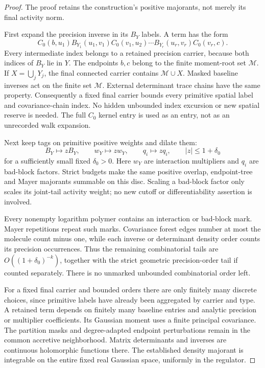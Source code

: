 \documentclass[11pt]{article}
\theoremstyle{remark}
\begin{document}
\begin{proof}
The proof retains the construction's positive majorants, not
merely its final activity norm.

First expand the precision inverse in its \(B_Y\) labels.
A term has the form
\[
 C_0(b,u_1)B_{Y_1}(u_1,v_1)C_0(v_1,u_2)
       \cdots B_{Y_r}(u_r,v_r)C_0(v_r,c).
\]
Every intermediate index belongs to a retained precision
carrier, because both indices of \(B_Y\) lie in \(Y\).
The endpoints \(b,c\) belong to the finite moment-root set
\(\mathcal M\). If \(X=\bigcup_jY_j\), the final connected
carrier contains \(\mathcal M\cup X\). Masked baseline
inverses act on the finite set \(\mathcal M\). External
determinant trace chains have the same property. Consequently
a fixed final carrier bounds every primitive spatial label
and covariance-chain index. No hidden unbounded index excursion
or new spatial reserve is needed. The full \(C_0\) kernel entry
is used as an entry, not as an unrecorded walk expansion.

Next keep tags on primitive positive weights and dilate them:
\begin{equation}
 B_Y\mapsto zB_Y,\qquad
 w_Y\mapsto zw_Y,\qquad q_i\mapsto zq_i,
 \qquad |z|\le1+\delta_0
 \label{qll-mark-dilation}
\end{equation}
for a sufficiently small fixed \(\delta_0>0\).
Here \(w_Y\) are interaction multipliers and \(q_i\) are
bad-block factors. Strict budgets make the same positive
overlap, endpoint-tree and Mayer majorants summable on this
disc. Scaling a bad-block factor only scales its joint-tail
activity weight; no new cutoff or differentiability assertion
is involved.

Every nonempty logarithm polymer contains an interaction or
bad-block mark. Mayer repetitions repeat such marks. Covariance
forest edges number at most the molecule count minus one,
while each inverse or determinant density order counts its
precision occurrences. Thus the remaining combinatorial tails
are \(O((1+\delta_0)^{-k})\), together with the strict geometric
precision-order tail if counted separately. There is no
unmarked unbounded combinatorial order left.

For a fixed final carrier and bounded orders there are only
finitely many discrete choices, since primitive labels have
already been aggregated by carrier and type. A retained term
depends on finitely many baseline entries and analytic
precision or multiplier coefficients. Its Gaussian moment
uses a finite principal covariance. The partition masks and
degree-adapted endpoint perturbations remain in the common
accretive neighborhood. Matrix determinants and inverses are
continuous holomorphic functions there. The established
density majorant is integrable on the entire fixed real
Gaussian space, uniformly in the regulator.


\end{proof}
\end{document}
